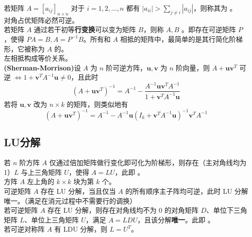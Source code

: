 \documentclass[./main.tex]{subfiles}
\begin{document}
若矩阵 $A=[a_{ij}]_{n\times n}$ 对于 $i=1,2,\dots,n$ 都有 $|a_{ii}|>\sum_{j\neq i}|a_{ij}|$，则称其为 。\\

对角占优矩阵必然可逆。\\

若矩阵 $A$ 通过若干初等\textbf{行变换}可以变为矩阵 $B$，则称 $A,B$ 。即存在可逆矩阵 $P$，使得 $PA=B,A=P^{-1}B$。所有和 $A$ 相抵的矩阵中，最简单的是其行简化阶梯形，它被称为 $A$ 的。\\

左相抵构成等价关系。\\

\textbf{(Sherman-Morrison)}设 $A$ 为 $n$ 阶可逆方阵，$\bm{u},\bm{v}$ 为 $n$ 阶向量，则 $A+\bm{uv}^T$ 可逆 $\iff 1+\bm{v}^TA^{-1}\bm{u}\neq 0$，且此时
\begin{equation}
    (A+\bm{uv}^T)^{-1}=A^{-1}-\frac{A^{-1}\bm{uv}^TA^{-1}}{1+\bm{v}^TA^{-1}\bm{u}}
\end{equation}
若将 $\bm{u},\bm{v}$ 改为 $n\times k$ 的矩阵，则类似地有
\begin{equation}
    (A+\bm{uv}^T)^{-1}=A^{-1}-A^{-1}\bm{u}(I_k+\bm{v}^TA^{-1}\bm{u})^{-1}\bm{v}^TA^{-1}
\end{equation}

\subsection{LU分解}
若 $n$ 阶方阵 $A$ 仅通过倍加矩阵做行变化即可化为阶梯形，则存在（主对角线均为1）$L$ 与上三角矩阵 $U$，使得 $A=LU$，此即 。\\

方阵 $A$ 左上角的 $k\times k$ 块为第 $k$ 个。\\

可逆矩阵 $A$ 存在 LU 分解，当且仅当 $A$ 的所有顺序主子阵均可逆，此时 LU 分解唯一。（满足在消元过程中不需要行的调换）\\

若可逆矩阵 $A$ 存在 LU 分解，则存在对角线均不为 0 的对角矩阵 $D$、单位下三角矩阵 $L$、单位上三角矩阵 $U$，满足 $A=LDU$，且该分解\textbf{唯一}。此即 。\\

若可逆对称阵 $A$ 有 LDU 分解，则 $L=U^T$。\\
\end{document}
